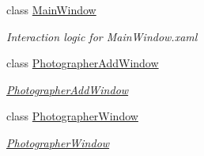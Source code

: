 \begin{DoxyCompactItemize}
class \mbox{\hyperlink{class_pic_d_b_1_1_main_window}{Main\+Window}}
\begin{DoxyCompactList}\small\item\em Interaction logic for Main\+Window.\+xaml \end{DoxyCompactList}\item 
class \mbox{\hyperlink{class_pic_d_b_1_1_photographer_add_window}{Photographer\+Add\+Window}}
\begin{DoxyCompactList}\small\item\em \mbox{\hyperlink{class_pic_d_b_1_1_photographer_add_window}{Photographer\+Add\+Window}} \end{DoxyCompactList}\item 
class \mbox{\hyperlink{class_pic_d_b_1_1_photographer_window}{Photographer\+Window}}
\begin{DoxyCompactList}\small\item\em \mbox{\hyperlink{class_pic_d_b_1_1_photographer_window}{Photographer\+Window}} \end{DoxyCompactList}\end{DoxyCompactItemize}
